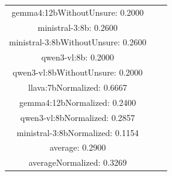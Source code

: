 \documentclass[a4paper]{article}
\begin{document}
\begin{tabular}{ccc}
gemma4:12bWithoutUnsure: 0.2000 \\ ministral-3:8b: 0.2600 \\ ministral-3:8bWithoutUnsure: 0.2600 \\ qwen3-vl:8b: 0.2000 \\ qwen3-vl:8bWithoutUnsure: 0.2000 \\ llava:7bNormalized: 0.6667 \\ gemma4:12bNormalized: 0.2400 \\ qwen3-vl:8bNormalized: 0.2857 \\ ministral-3:8bNormalized: 0.1154 \\ average: 0.2900 \\ averageNormalized: 0.3269 \end{minipage}\\
\end{tabular}

\vspace{5mm}
\end{document}
